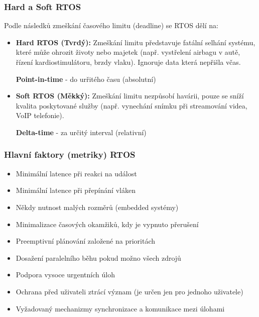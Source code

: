 \subsubsection*{Hard a Soft RTOS}
Podle následků zmeškání časového limitu (deadline) se RTOS dělí na:
\begin{itemize}
    \item \textbf{Hard RTOS (Tvrdý):} Zmeškání limitu představuje fatální selhání systému, které může ohrozit životy nebo majetek (např. vystřelení airbagu v autě, řízení kardiostimulátoru, brzdy vlaku).
        Ignoruje data která nepřišla včas.

    \textbf{Point-in-time} - do urřitého času (absolutní)
    \item \textbf{Soft RTOS (Měkký):} Zmeškání limitu nezpůsobí havárii, pouze se sníží kvalita poskytované služby (např. vynechání snímku při streamování videa, VoIP telefonie).
    
    \textbf{Delta-time} - za určitý interval (relativní)
\end{itemize}

\subsubsection*{Hlavní faktory (metriky) RTOS}
\begin{itemize}
    \item Minimální latence při reakci na událost
    \item Minimální latence při přepínání vláken
    \item Někdy nutnost malých rozměrů (embedded systémy)
    \item Minimalizace časových okamžiků, kdy je vypnuto přerušení
    \item Preemptivní plánování založené na prioritách
    \item Dosažení paralelního běhu pokud možno všech zdrojů
    \item Podpora vysoce urgentních úloh
    \item Ochrana před uživateli ztrácí význam (je určen jen pro jednoho uživatele)
    \item Vyžadovaný mechanizmy synchronizace a komunikace mezi úlohami
\end{itemize}


